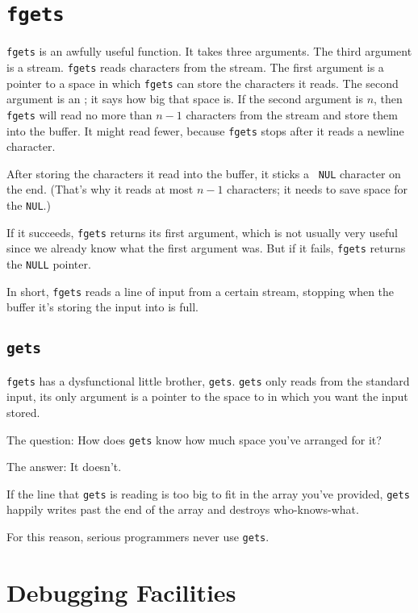 %
%
%

\section{{\tt fgets}}

{\tt fgets} is an awfully useful function.  It takes three arguments.
The third argument is a stream.  {\tt fgets} reads characters from the
stream.  The first argument is a pointer to a space in which {\tt fgets}
can store the characters it reads.  The second argument is an \int; it
says how big that space is.  If the second argument is $n$, then {\tt
fgets} will read no more than $n-1$ characters from the stream and store
them into the buffer.  It might read fewer, because {\tt fgets} stops
after it reads a newline character.  

After storing the characters it read into the buffer, it sticks a {\tt
NUL} character on the end.  (That's why it reads at most $n-1$
characters; it needs to save space for the {\tt NUL}.)  

If it succeeds, {\tt fgets} returns its first argument, which is not
usually very useful since we already know what the first argument was.
But if it fails, {\tt fgets} returns the {\tt NULL} pointer.

In short, {\tt fgets} reads a line of input from a certain stream,
stopping when the buffer it's storing the input into is full.

\subsection{{\tt gets}}

{\tt fgets} has a dysfunctional little brother, {\tt gets}.  {\tt gets}
only reads from the standard input, its only argument is a pointer to
the space to in which you want the input stored.  

The question:  How does {\tt gets} know how much space you've arranged
for it?

The answer:  It doesn't.

If the line that {\tt gets} is reading is too big to fit in the array
you've provided, {\tt gets} happily writes past the end of the array and
destroys who-knows-what.

For this reason, serious programmers never use {\tt gets}.

\section{Debugging Facilities}

